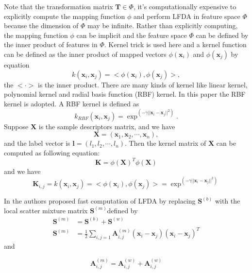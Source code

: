 Note that the transformation matrix $\bm{T} \in \Phi$, it's computationally expensive to explicitly compute the mapping function $\phi$ and perform LFDA in feature space $\Phi$ because the dimension of $\Phi$ may be infinite. Rather than explicitly computing, the mapping function $\phi$ can be implicit and the feature space $\Phi$ can be defined by the inner product of features in $\Phi$. Kernel trick is used here and a kernel function can be defined as the inner product of mapped vectors $\phi(\bm{x}_i)$ and $\phi(\bm{x}_j)$ by equation
 \begin{equation}
 k(\bm{x}_i,\bm{x}_j) = <\phi(\bm{x}_i),\phi(\bm{x}_j)>,
 \end{equation}
 the $< \cdot >$ is the inner product. There are many kinds of kernel like linear kernel, polynomial kernel and radial basis function (RBF) kernel. In this paper the RBF kernel is adopted. A RBF kernel is defined as 
 \begin{equation}
 k_{RBF}(\bm{x}_i,\bm{x}_j) = \exp^{(-\gamma||\bm{x}_i-\bm{x}_j||^2)}. 
 \end{equation}
Suppose $\bm{X}$ is the sample descriptors matrix, and we have
\begin{equation}
\bm{X} = (\bm{x}_1, \bm{x}_2,\cdots, \bm{x}_n), 
\end{equation}
and the label vector is $\bm{l} = (l_1, l_2, \cdots, l_n)$. Then the kernel matrix of $\bm{X}$ can be computed as following equation:
\begin{equation}
\bm{K} =  \phi(\bm{X})^T \phi(\bm{X})
\end{equation}
and we have 
\begin{equation}
\bm{K}_{i,j} =  k(\bm{x}_i,\bm{x}_j) = <\phi(\bm{x}_i),\phi(\bm{x}_j)> =  \exp^{(-\gamma||\bm{x}_i-\bm{x}_j||^2)}
\end{equation}

In \cite{KLFDA} the authors proposed fast computation of LFDA by replacing $\bm{S}^{(b)}$ with the local scatter mixture matrix $\bm{S}^{(m)}$defined by 
\begin{equation}
\begin{aligned}
\bm{S}^{(m)} &= \bm{S}^{(b)} + \bm{S}^{(w)}\\
\bm{S}^{(m)} &= \frac{1}{2} \sum_{i,j = 1} \bm{A}_{i,j}^{(m)} (\bm{x}_i - \bm{x}_j)(\bm{x}_i - \bm{x}_j)^T
\end{aligned}
\end{equation}
and 

\begin{equation}
\bm{A}_{i,j}^{(m)} = \bm{A}_{i,j}^{(w)}  + \bm{A}_{i,j}^{(w)}
\end{equation}

